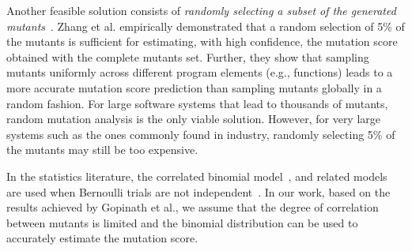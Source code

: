 Another feasible solution consists of  \emph{randomly selecting a subset of the generated mutants}~\cite{zhang2010operator,gopinath2015hard,zhang2013operator}.
Zhang et al. \cite{zhang2013operator} empirically demonstrated that a random selection of 5\% of the mutants is sufficient for
estimating, with high confidence, the mutation score obtained with the complete mutants set.
Further,
they show that sampling mutants uniformly across different program elements (e.g., functions)
leads to a more accurate mutation score prediction than sampling mutants globally in a random fashion.
For large software systems that lead to thousands of mutants, random mutation analysis is the only viable solution. However, for very large systems such as the ones commonly found in industry, randomly selecting 5\% of the mutants may still be too expensive.


In the statistics literature, the correlated binomial model~\cite{Bahadur},
and related models~\cite{Kupper1978,NG:ModifiedBinomialDistributions:1989,VanDerGeest:2005} are used when Bernoulli trials are not independent~\cite{Zhang:CrrelatedFirearm:NIST:2019}.
In our work, based on the results achieved by Gopinath et al., we assume that the degree of correlation between mutants is limited and the binomial distribution can be used to accurately estimate the mutation score.



